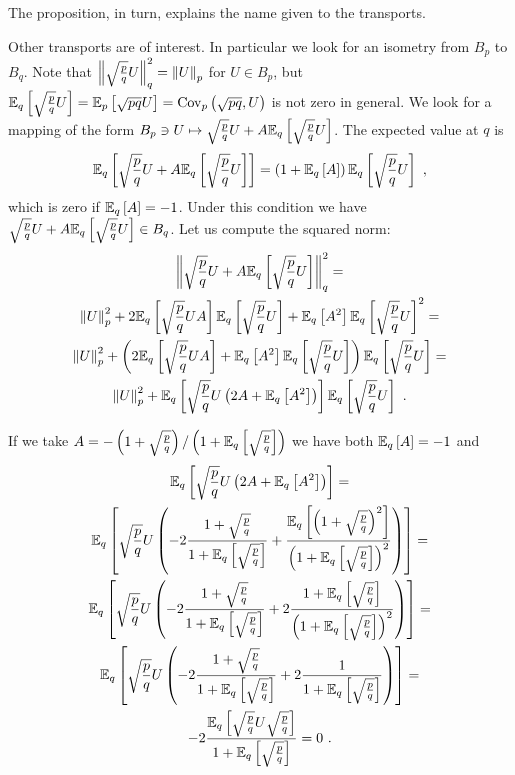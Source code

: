\documentclass[12pt,a4paper]{amsart}
\begin{document}
The proposition, in turn, explains the name given to the transports.

Other transports are of interest. In particular we look for an isometry from $B_p$ to $B_q$. Note that $\normat q {\sqrt{\frac pq} U}^2 = \normat p U$ for $U \in B_p$, but $\expectat q {\sqrt{\frac pq} U} = \expectat p {\sqrt{pq} U} = \covat p {\sqrt{pq}}{U}$ is not zero in general. We look for a mapping of the form $B_p \ni U \mapsto \sqrt{\frac pq} U + A\expectat q {\sqrt{\frac pq} U}$. The expected value at $q$ is
%
\begin{equation*}
  \expectat q {\sqrt{\frac pq} U + A\expectat q {\sqrt{\frac pq} U}} = \left(1+\expectat q A\right)\expectat q {\sqrt{\frac pq} U} \ ,
\end{equation*}
%
which is zero if $\expectat q A = -1$. Under this condition we have $\sqrt{\frac pq} U + A\expectat q {\sqrt{\frac pq} U} \in B_q$. Let us compute the squared norm:
%
\begin{multline*}
  \normat q {\sqrt{\frac pq} U + A\expectat q {\sqrt{\frac pq} U}}^2 = \\ \normat p U ^2 + 2\expectat q {\sqrt{\frac pq} U A} \expectat q {\sqrt{\frac pq} U} + \expectat q {A^2} \expectat q {\sqrt{\frac pq} U}^2 = \\ \normat p U ^2 + \left(2\expectat q {\sqrt{\frac pq} U A}  + \expectat q {A^2} \expectat q {\sqrt{\frac pq} U} \right) \expectat q {\sqrt{\frac pq} U} = \\ \normat p U ^2 + \expectat q {\sqrt{\frac pq} U \left(2A + \expectat q {A^2} \right) } \expectat q {\sqrt{\frac pq} U} \ .
\end{multline*}

If we take $ A = - \left(1+\sqrt{\frac pq}\right)/\left(1 + \expectat q {\sqrt{\frac pq}}\right)$ we have both $\expectat q A = -1$ and
%
\begin{multline*}
  \expectat q {\sqrt{\frac pq} U \left(2A + \expectat q {A^2} \right) } = \\
 \expectat q {\sqrt{\frac pq} U \left(-2\frac{1+\sqrt{\frac pq}}{1 + \expectat q {\sqrt{\frac pq}}} + \frac{\expectat q {\left(1+ \sqrt{\frac pq}\right)^2}}{\left(1+\expectat q {\sqrt{\frac pq}}\right)^2} \right) } = \\ \expectat q {\sqrt{\frac pq} U \left(-2\frac{1+\sqrt{\frac pq}}{1 + \expectat q {\sqrt{\frac pq}}} + 2 \frac{1+ \expectat q {\sqrt{\frac pq}}}{\left(1+\expectat q {\sqrt{\frac pq}}\right)^2} \right) } = \\ \expectat q {\sqrt{\frac pq} U \left(-2\frac{1+\sqrt{\frac pq}}{1 + \expectat q {\sqrt{\frac pq}}} + 2 \frac{1}{1+\expectat q {\sqrt{\frac pq}}} \right) } = \\ -2 \frac{\expectat q {\sqrt{\frac pq} U \sqrt{\frac pq} }}{1+\expectat q {\sqrt{\frac pq}}} = 0 \ .
\end{multline*}
\end{document}

